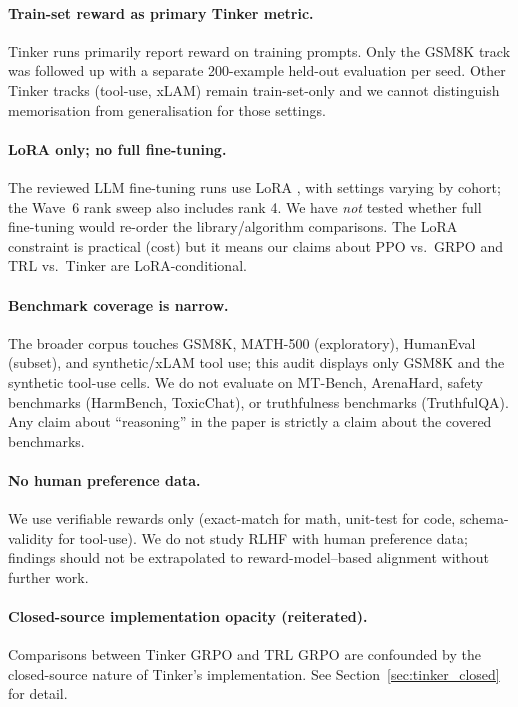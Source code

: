 \paragraph{Train-set reward as primary Tinker metric.}
Tinker runs primarily report reward on training prompts. Only the GSM8K
track was followed up with a separate 200-example held-out evaluation
per seed. Other Tinker tracks (tool-use, xLAM) remain train-set-only and
we cannot distinguish memorisation from generalisation for those
settings.

\paragraph{LoRA only; no full fine-tuning.}
The reviewed LLM fine-tuning runs use LoRA \cite{hu2022lora}, with settings
varying by cohort; the Wave~6 rank sweep also includes rank 4. We have
\emph{not} tested whether full fine-tuning would re-order the
library/algorithm comparisons. The LoRA constraint is practical (cost) but
it means our claims about PPO vs.\ GRPO and TRL vs.\ Tinker are
LoRA-conditional.

\paragraph{Benchmark coverage is narrow.}
The broader corpus touches GSM8K, MATH-500 (exploratory), HumanEval
(subset), and synthetic/xLAM tool use; this audit displays only GSM8K and the
synthetic tool-use cells. We do not evaluate on MT-Bench,
ArenaHard, safety benchmarks (HarmBench, ToxicChat), or truthfulness
benchmarks (TruthfulQA). Any claim about ``reasoning'' in the paper is
strictly a claim about the covered benchmarks.

\paragraph{No human preference data.}
We use verifiable rewards only (exact-match for math, unit-test for code,
schema-validity for tool-use). We do not study RLHF with human preference
data; findings should not be extrapolated to reward-model--based alignment
without further work.

\paragraph{Closed-source implementation opacity (reiterated).}
Comparisons between Tinker GRPO and TRL GRPO are confounded by the
closed-source nature of Tinker's implementation. See
Section~\ref{sec:tinker_closed} for detail.

